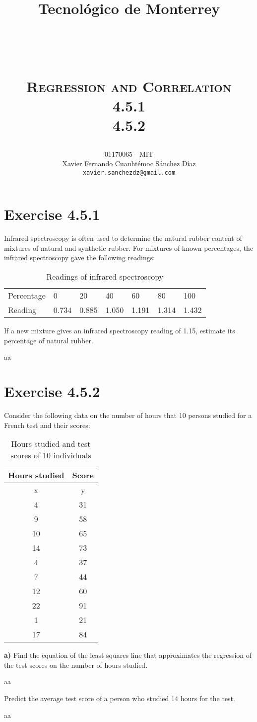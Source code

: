 \documentclass[titlepage, letterpaper, fleqn]{article}
\title{
\vspace{1in}
\textbf{Tecnológico de Monterrey} \\
\vspace{0.5in}
\textmd{\mahclass} \\
\large{\textit{\mahteacher}} \\
\vspace{0.5in}
\textsc{\mahtitle}\\
\textsc{Regression and Correlation}\\
\textsc{4.5.1}\\
\textsc{4.5.2}\\
\author{01170065  - MIT \\
Xavier Fernando Cuauhtémoc Sánchez Díaz \\
\texttt{xavier.sanchezdz@gmail.com}}
\date{\mahdate}
}
\newcommand{\spacepls}{\vspace{5mm}}
\begin{document}
\begin{titlepage}
\maketitle
\end{titlepage}

%
%

\section{Exercise 4.5.1}

{\large Infrared spectroscopy is often used to determine the natural rubber content of mixtures of natural and synthetic rubber.
For mixtures of known percentages, the infrared spectroscopy gave the following readings:}

\begin{table}[h!]
\centering
\begin{tabular}{@{}lllllll@{}}
\toprule
Percentage & 0 & 20 & 40 & 60 & 80 & 100 \\
Reading & 0.734 & 0.885 & 1.050 & 1.191 & 1.314 & 1.432 \\ \bottomrule
\end{tabular}
\caption{Readings of infrared spectroscopy}
\label{tab4.5.1}
\end{table}

{\large If a new mixture gives an infrared spectroscopy reading of 1.15, estimate its percentage of natural rubber.}

aa

\spacepls

\section{Exercise 4.5.2}

{\large Consider the following data on the number of hours that 10 persons studied for a French test and their scores:}

\begin{table}[h!]
\centering
\begin{tabular}{@{}cc@{}}
\toprule
Hours studied & Score \\ \midrule
x & y \\
4 & 31 \\
9 & 58 \\
10 & 65 \\
14 & 73 \\
4 & 37 \\
7 & 44 \\
12 & 60 \\
22 & 91 \\
1 & 21 \\
17 & 84 \\ \bottomrule
\end{tabular}
\caption{Hours studied and test scores of 10 individuals}
\label{tab4.5.2}
\end{table}


{\large \textbf{a)} Find the equation of the least squares line that approximates the regression of the test scores on the number of hours studied.}

aa

\spacepls

{\large Predict the average test score of a person who studied 14 hours for the test.}

aa
\end{document}
